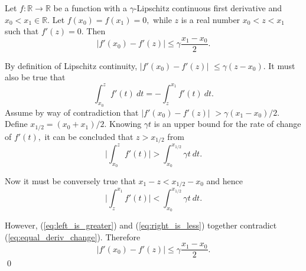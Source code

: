 \documentclass[smallextended,final]{svjour3}  %
\begin{document}
\begin{onetheorem}
  Let $f: \mathbb{R} \rightarrow \mathbb{R}$ be a function with a
  $\gamma$-Lipschitz continuous first derivative and $x_0 < x_1 \in
  \mathbb{R}$. Let $f(x_0) = f(x_1) = 0,$ while $z$ is a real number
  $x_0 < z < x_1$ such that $f'(z) = 0.$ Then
  $$ \big| f'(x_0) - f'(z) \big| \leq \gamma \frac{x_1 - x_0}{2}.$$
\end{onetheorem}

\begin{proofdot}
  By definition of Lipschitz continuity, $\big| f'(x_0) - f'(z) \big|$
  $\leq \gamma (z - x_0).$ It must also be true that
  \begin{equation}
    \label{eq:equal_deriv_change}
    \int_{x_0}^z f'(t)\ dt = - \int_z^{x_1} f'(t)\ dt.
  \end{equation}
  Assume by way of contradiction that $\big| f'(x_0) - f'(z) \big|$ $>
  \gamma (x_1 - x_0) / 2.$ Define $x_{1/2} = (x_0 + x_1) / 2.$ Knowing
  $\gamma t$ is an upper bound for the rate of change of $f'(t),$ it
  can be concluded that $z > x_{1/2}$ from
  \begin{equation}
    \label{eq:left_is_greater}
    \bigg| \int_{x_0}^z f'(t) \bigg| > \int_{x_0}^{x_{1/2}} \gamma
    t\ dt.
  \end{equation}

\noindent Now it must be conversely true that $x_1 - z < x_{1/2} -
x_0$ and hence
  \begin{equation}
    \label{eq:right_is_less}
    \bigg| \int_z^{x_1} f'(t) \bigg| < \int_{x_0}^{x_{1/2}} \gamma
    t\ dt.
  \end{equation}

  \noindent However, (\ref{eq:left_is_greater}) and
  (\ref{eq:right_is_less}) together contradict
  (\ref{eq:equal_deriv_change}). Therefore
  \begin{equation}
    \label{eq:deriv_error_bound}
    |f'(x_0) - f'(z)| \leq \gamma \frac{x_1 - x_0}{2}.
  \end{equation}
\qed
\end{proofdot}
\end{document}
